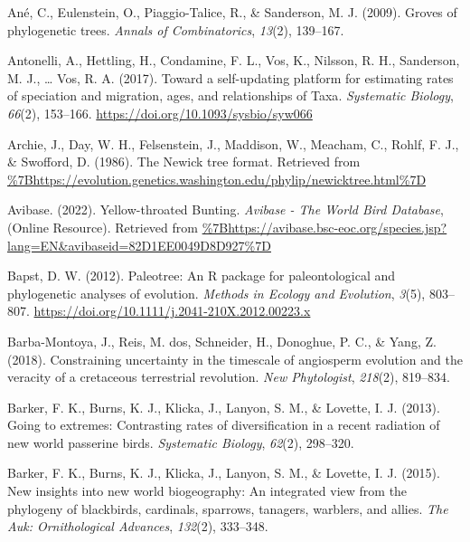\documentclass[
  english,
  man]{apa6}
\newlength{\cslhangindent}
\newlength{\cslentryspacingunit} %
\newenvironment{CSLReferences}[2] %
 {%
  \setlength{\parindent}{0pt}
  \ifodd #1
  \let\oldpar\par
  \def\par{\hangindent=\cslhangindent\oldpar}
  \fi
  \setlength{\parskip}{#2\cslentryspacingunit}
 }%
 {}
\begin{document}
\hypertarget{refs}{}
\begin{CSLReferences}{1}{0}
\leavevmode{}%
Ané, C., Eulenstein, O., Piaggio-Talice, R., \& Sanderson, M. J. (2009). Groves of phylogenetic trees. \emph{{Annals of Combinatorics}}, \emph{13}(2), 139--167.

\leavevmode{}%
Antonelli, A., Hettling, H., Condamine, F. L., Vos, K., Nilsson, R. H., Sanderson, M. J., \ldots{} Vos, R. A. (2017). {Toward a self-updating platform for estimating rates of speciation and migration, ages, and relationships of Taxa}. \emph{Systematic Biology}, \emph{66}(2), 153--166. \url{https://doi.org/10.1093/sysbio/syw066}

\leavevmode{}%
Archie, J., Day, W. H., Felsenstein, J., Maddison, W., Meacham, C., Rohlf, F. J., \& Swofford, D. (1986). {The Newick tree format}. Retrieved from \url{\%7Bhttps://evolution.genetics.washington.edu/phylip/newicktree.html\%7D}

\leavevmode{}%
Avibase. (2022). {Yellow-throated Bunting}. \emph{{Avibase - The World Bird Database}}, (Online Resource). Retrieved from \url{\%7Bhttps://avibase.bsc-eoc.org/species.jsp?lang=EN\&avibaseid=82D1EE0049D8D927\%7D}

\leavevmode{}%
Bapst, D. W. (2012). {Paleotree: An R package for paleontological and phylogenetic analyses of evolution}. \emph{{Methods in Ecology and Evolution}}, \emph{3}(5), 803--807. \url{https://doi.org/10.1111/j.2041-210X.2012.00223.x}

\leavevmode{}%
Barba-Montoya, J., Reis, M. dos, Schneider, H., Donoghue, P. C., \& Yang, Z. (2018). Constraining uncertainty in the timescale of angiosperm evolution and the veracity of a cretaceous terrestrial revolution. \emph{New Phytologist}, \emph{218}(2), 819--834.

\leavevmode{}%
Barker, F. K., Burns, K. J., Klicka, J., Lanyon, S. M., \& Lovette, I. J. (2013). Going to extremes: Contrasting rates of diversification in a recent radiation of new world passerine birds. \emph{{Systematic Biology}}, \emph{62}(2), 298--320.

\leavevmode{}%
Barker, F. K., Burns, K. J., Klicka, J., Lanyon, S. M., \& Lovette, I. J. (2015). New insights into new world biogeography: An integrated view from the phylogeny of blackbirds, cardinals, sparrows, tanagers, warblers, and allies. \emph{{The Auk: Ornithological Advances}}, \emph{132}(2), 333--348.


\end{CSLReferences}
\end{document}
